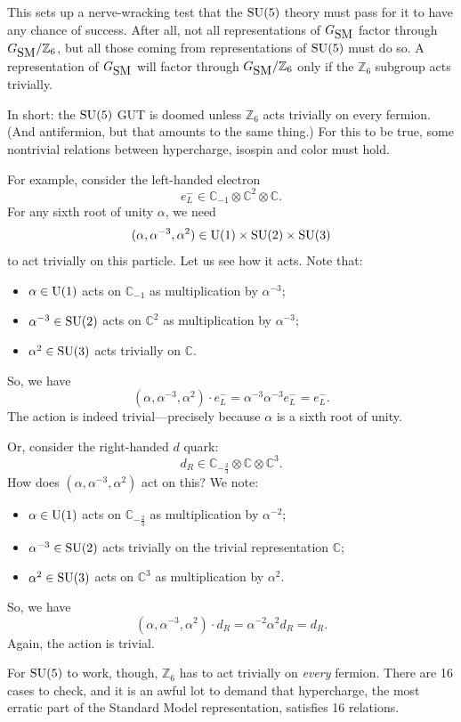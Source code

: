 \documentclass{article}
\newcommand{\C}{{\mathbb C}}  %
\newcommand{\Z}{{\mathbb Z}}  %
\newcommand{\U}{{\rm U}}    %
\newcommand{\SU}{{\rm SU}}    %
\newcommand{\twothirds}{\frac{2}{3}} %
\newcommand{\GSM}{{G_{\mbox{\rm SM}}}}  %
\begin{document}
This sets up a nerve-wracking test that the $\SU(5)$ theory must pass
for it to have any chance of success.  After all, not all
representations of $\GSM$ factor through $\GSM/\Z_6$, but all those
coming from representations of $\SU(5)$ must do so.  A representation
of $\GSM$ will factor through $\GSM/\Z_6$ only if the $\Z_6$ subgroup acts
trivially.

In short: the $\SU(5)$ GUT is doomed unless $\Z_6$ acts trivially on
every fermion.  (And antifermion, but that amounts to the same thing.)
For this to be true, some nontrivial relations between hypercharge, 
isospin and color must hold.

For example, consider the left-handed electron
\[ e^-_L \in \C_{-1} \otimes \C^2 \otimes \C .\]
For any sixth root of unity $\alpha$, we need
\[ (\alpha, \alpha^{-3}, \alpha^2) \in \U(1) \times \SU(2) \times \SU(3) \]
to act trivially on this particle.  Let us see how it acts.  Note that:
\begin{itemize}
\item
$\alpha \in \U(1)$ acts on $\C_{-1}$ as multiplication by $\alpha^{-3}$;
\item 
$\alpha^{-3} \in \SU(2)$ acts on $\C^2$ as multiplication by $\alpha^{-3}$;
\item 
$\alpha^2 \in \SU(3)$ acts trivially on $\C$.
\end{itemize}
So, we have 
\[ (\alpha, \alpha^{-3}, \alpha^2) \cdot e^-_L = 
\alpha^{-3} \alpha^{-3} e^-_L = e^-_L .\]
The action is indeed trivial---precisely because 
$\alpha$ is a sixth root of unity.

Or, consider the right-handed $d$ quark:
\[ d_R \in \C_{-\twothirds} \otimes \C \otimes \C^3. \]
How does $(\alpha, \alpha^{-3}, \alpha^2)$ act on this?
We note:
\begin{itemize}
\item
$\alpha \in \U(1)$ acts on $\C_{-\twothirds}$ as multiplication by 
$\alpha^{-2}$;
\item 
$\alpha^{-3} \in \SU(2)$ acts trivially on the trivial representation
$\C$;
\item 
$\alpha^2 \in \SU(3)$ acts on $\C^3$ as multiplication by $\alpha^2$.
\end{itemize}
So, we have
\[ (\alpha, \alpha^{-3}, \alpha^2) \cdot d_R 
= \alpha^{-2} \alpha^2 d_R = d_R .\]
Again, the action is trivial.

For $\SU(5)$ to work, though, $\Z_6$ has to act trivially on \emph{every}
fermion.  There are 16 cases to check, and it is an awful lot to demand that
hypercharge, the most erratic part of the Standard Model 
representation, satisfies 16 relations.
\end{document}
